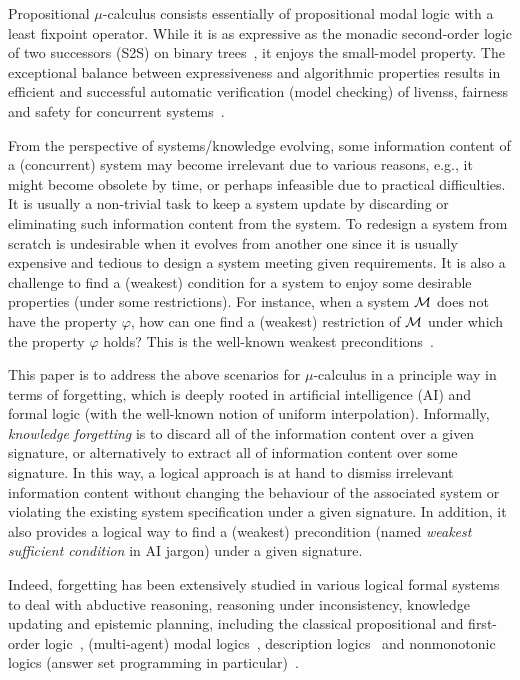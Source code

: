 \documentclass[sn-mathphys]{sn-jnl}%
\theoremstyle{thmstyleone}%
\theoremstyle{thmstyletwo}%
\theoremstyle{thmstylethree}%
\begin{document}
Propositional $\mu$-calculus consists essentially of propositional modal logic with a least fixpoint operator.
While it is as expressive as the monadic second-order logic of two successors (S2S) on binary trees~\cite{emerson1991tree,niwinski1988fixed}, 
it enjoys the small-model property. The exceptional balance between expressiveness and algorithmic properties
results in efficient and successful automatic verification (model checking) of livenss, fairness and safety for concurrent systems~\cite{emerson1997model}.

From the perspective of systems/knowledge evolving, some information content of a (concurrent) system may become
irrelevant due to various reasons, e.g., it might become obsolete by time, or perhaps infeasible due to practical difficulties.
It is usually a non-trivial task  to keep a system update by
discarding or eliminating such information content from the system. To redesign a system from scratch is undesirable 
when it evolves from another one since  it is usually expensive and tedious to design a system meeting  given requirements.
It is also a challenge  to find a (weakest) condition for
a system to enjoy some desirable properties (under some restrictions). For instance, when a system
${\cal M}$ does not have the property $\varphi$, how can one find a (weakest) restriction of ${\cal M}$ under which the property $\varphi$ holds?
This is the well-known weakest preconditions~\cite{DBLP:journals/cacm/Dijkstra75}.

This paper is to address the above scenarios for $\mu$-calculus in a principle way in terms of forgetting,
which is deeply rooted in artificial intelligence (AI) and formal logic (with the well-known notion of uniform interpolation).
Informally, {\em knowledge forgetting} is to discard all of the information content over a given signature, or alternatively to 
extract all of information content over some signature.
In this way, a logical approach is at hand to dismiss irrelevant information content without changing the behaviour of  the  associated  system  or  violating  the  existing  system  specification under a  given signature. In addition, it also provides a logical way to find a (weakest) precondition (named {\em weakest sufficient condition} in AI jargon)  under a  given signature. 


Indeed, forgetting has been extensively studied in  various logical formal systems to deal with  abductive reasoning, reasoning under inconsistency, knowledge updating and epistemic planning, including the classical propositional and first-order
logic~\cite{Fangzhen:forgetit,DBLP:Lin:AIJ:2001,lang2003propositional}, (multi-agent) modal logics~\cite{su2004reasoning,baral2005knowledge,Yan:AIJ:2009,fang2019forgetting,feng2020sufficient}, description logics~\cite{konev2009forgetting,Lutz:IJCAI:2011,DBLP:conf/aaai/ZhaoSWZF20} and nonmonotonic logics (answer set programming in particular)~\cite{DBLP:journals/ai/EiterW08,wang2013forgetting,DBLP:journals/jair/WangZZZ14,Yisong:AAAI:2015,Delgrande:AAAI:2015,gonccalves2020limits}. 
\end{document}
